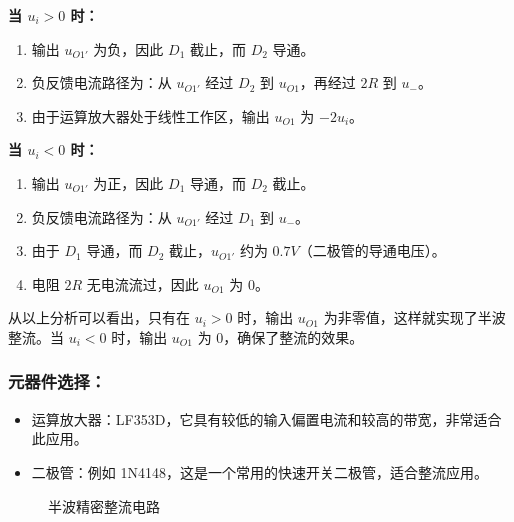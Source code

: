 \documentclass[UTF8,titlepage,a4paper]{ctexart}
\numberwithin{figure}{section}
\begin{document}
\textbf{当 $u_i > 0$ 时：}

\begin{enumerate}
    \item 输出 \( u_{O1'} \) 为负，因此 \( D_1 \) 截止，而 \( D_2 \) 导通。
    \item 负反馈电流路径为：从 \( u_{O1'} \) 经过 \( D_2 \) 到 \( u_{O1} \)，再经过 \( 2R \) 到 \( u_- \)。
    \item 由于运算放大器处于线性工作区，输出 \( u_{O1} \) 为 \( -2u_i \)。
\end{enumerate}

\textbf{当 $u_i < 0$ 时：}

\begin{enumerate}
    \item 输出 \( u_{O1'} \) 为正，因此 \( D_1 \) 导通，而 \( D_2 \) 截止。
    \item 负反馈电流路径为：从 \( u_{O1'} \) 经过 \( D_1 \) 到 \( u_- \)。
    \item 由于 \( D_1 \) 导通，而 \( D_2 \) 截止，\( u_{O1'} \) 约为 \( 0.7V \)（二极管的导通电压）。
    \item 电阻 \( 2R \) 无电流流过，因此 \( u_{O1} \) 为 0。
\end{enumerate}

从以上分析可以看出，只有在 \( u_i > 0 \) 时，输出 \( u_{O1} \) 为非零值，这样就实现了半波整流。当 \( u_i < 0 \) 时，输出 \( u_{O1} \) 为 0，确保了整流的效果。

\subsubsection{元器件选择：}

\begin{itemize}
    \item 运算放大器：LF353D，它具有较低的输入偏置电流和较高的带宽，非常适合此应用。
    \item 二极管：例如 1N4148，这是一个常用的快速开关二极管，适合整流应用。
\end{itemize}

\begin{figure}[H]
\centering
 \caption{半波精密整流电路}
 \label{}
\end{figure}
\end{document}
